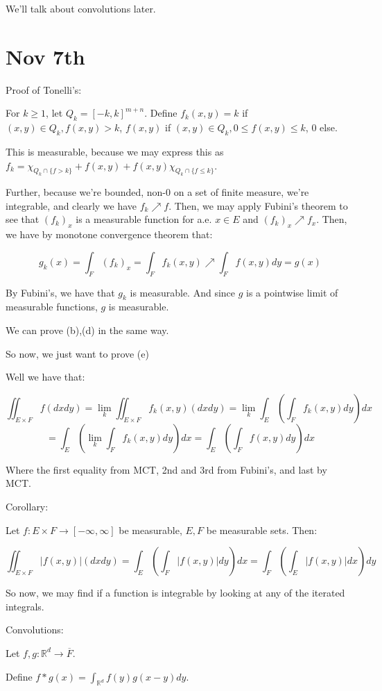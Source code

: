 \documentclass[10pt]{article}
\begin{document}
We’ll talk about convolutions later.

\section*{Nov 7th}

Proof of Tonelli’s:

For $k \geq 1$, let $Q_k = [-k,k]^{m+n}$. Define $f_k (x,y) = k$ if $(x,y) \in Q_k, f(x,y) > k$, $f(x,y)$ if $(x,y) \in Q_k, 0 \leq f(x,y) \leq k$, $0$ else.

This is measurable, because we may express this as $f_k = \chi_{Q_k \cap \{ f > k \}} + f(x,y) + f(x,y)\chi_{Q_k \cap \{ f \leq k \}}$.

Further, because we’re bounded, non-0 on a set of finite measure, we’re integrable, and clearly we have $f_k \nearrow f$. Then, we may apply Fubini’s theorem to see that $(f_k)_x$ is a measurable function for a.e. $x \in E$ and $(f_k)_x \nearrow f_x$. Then, we have by monotone convergence theorem that:

$$ g_k(x) = \int_F (f_k)_x = \int_F f_k(x,y) \nearrow \int_F f(x,y) dy = g(x)$$

By Fubini’s, we have that $g_k$ is measurable. And since $g$ is a pointwise limit of measurable functions, $g$ is measurable.

We can prove (b),(d) in the same way.

So now, we just want to prove (e)

Well we have that:

$$\iint_{E \times F} f (dxdy) = \lim_k \iint_{E \times F} f_k(x,y) (dxdy) = \lim_k \int_E (\int_F f_k(x,y)dy) dx $$
$$ = \int_E (\lim_k \int_F f_k(x,y)dy) dx = \int_E (\int_F f(x,y)dy) dx $$

Where the first equality from MCT, 2nd and 3rd from Fubini’s, and last by MCT.

Corollary:

Let $f : E \times F \to [-\infty,\infty]$ be measurable, $E, F$ be measurable sets. Then:

$$ \iint_{E\times F} | f(x,y)| (dxdy) = \int_E (\int_F |f(x,y)| dy) dx = \int_F (\int_E |f(x,y)| dx) dy$$

So now, we may find if a function is integrable by looking at any of the iterated integrals.

Convolutions:

Let $f,g: \mathbb{R}^d \to \overline{F}$.

Define $f \ast g (x) = \int_{\mathbb{R}^d} f(y) g(x-y) dy$.
\end{document}
